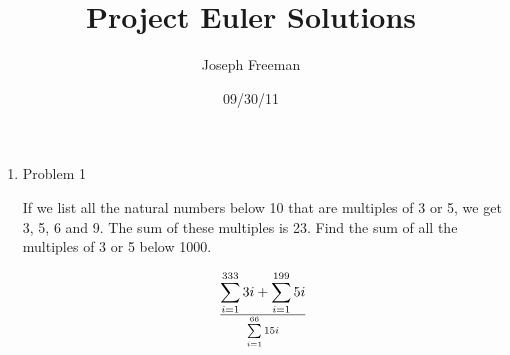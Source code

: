 \documentclass[letterpaper,12pt,oneside]{letter}
\author{Joseph Freeman}
\title{Project Euler Solutions}
\date{09/30/11}
\begin{document}
\begin{enumerate}
 \item Problem 1

If we list all the natural numbers below 10 that are multiples of 3 or 5, we get 3, 5, 6 and 9. The sum of these multiples is 23.
Find the sum of all the multiples of 3 or 5 below 1000.

\begin{displaymath}
  \sum\limits_{i = 1}^{333} 3i + \sum\limits_{i = 1}^{199} 5i \over \sum\limits_{i = 1}^{66} 15i
\end{displaymath}

\end{enumerate}
\end{document}
